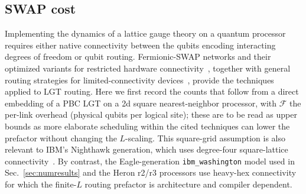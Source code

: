 \documentclass[twocolumn,superscriptaddress,showpacs,nofootinbib,notitlepage,preprintnumbers,secnumarabic,amssymb, floatfix, nobibnotes, aps, prd]{revtex4-2}
\newcommand{\washington}{\texttt{ibm\_washington}}
\begin{document}
\subsection{SWAP cost}
\label{sec:swap}
Implementing the dynamics of a lattice gauge theory on a quantum processor requires either native connectivity between the qubits encoding interacting degrees of freedom or qubit routing.  
Fermionic-SWAP networks and their optimized variants for restricted hardware connectivity~\cite{Kivlichan:2017ngt,Hashim:2021loh}, together with general routing strategies for limited-connectivity devices~\cite{Cowtan:2019jqo}, provide the techniques applied to LGT routing.  
Here we first record the counts that follow from a direct embedding of a PBC LGT on a 2d square nearest-neighbor processor, with $\mathcal{F}$ the per-link overhead (physical qubits per logical site); these are to be read as upper bounds as more elaborate scheduling within the cited techniques can lower the prefactor without changing the $L$-scaling.  
This square-grid assumption is also relevant to IBM's Nighthawk generation, which uses degree-four square-lattice connectivity~\cite{ibm-processor-types}. 
By contrast, the Eagle-generation \washington{} model used in Sec.~\ref{sec:numresults} and the Heron r2/r3 processors use heavy-hex connectivity for which the finite-$L$ routing prefactor is architecture and compiler dependent.
\end{document}
